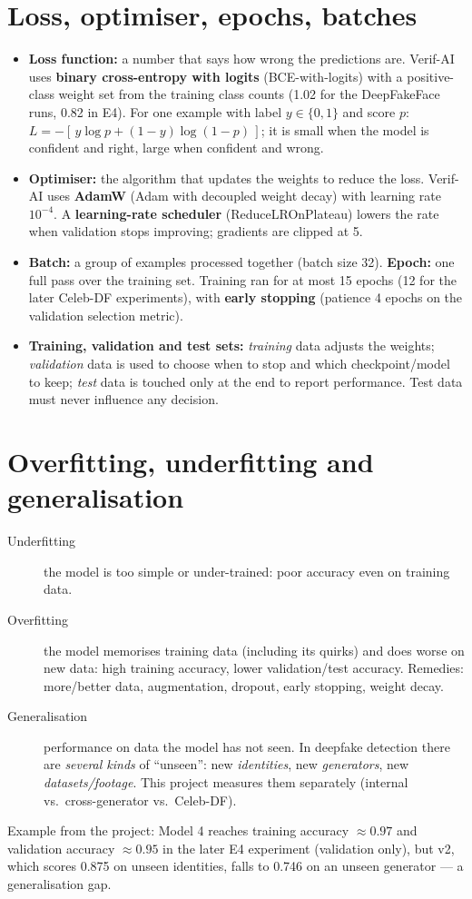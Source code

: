 \documentclass[11pt,a4paper]{report}
\begin{document}
\section{Loss, optimiser, epochs, batches}
\begin{itemize}
\item \textbf{Loss function:} a number that says how wrong the predictions are. Verif-AI uses \textbf{binary cross-entropy with logits} (BCE-with-logits) with a positive-class weight set from the training class counts (1.02 for the DeepFakeFace runs, 0.82 in E4).
For one example with label $y\in\{0,1\}$ and score $p$: $L=-[\,y\log p+(1-y)\log(1-p)\,]$; it is small when the model is confident and right, large when confident and wrong.
\item \textbf{Optimiser:} the algorithm that updates the weights to reduce the loss. Verif-AI uses \textbf{AdamW} (Adam with decoupled weight decay) with learning rate $10^{-4}$. A \textbf{learning-rate scheduler} (ReduceLROnPlateau) lowers the rate when validation stops improving; gradients are clipped at 5.
\item \textbf{Batch:} a group of examples processed together (batch size 32). \textbf{Epoch:} one full pass over the training set. Training ran for at most 15 epochs (12 for the later Celeb-DF experiments), with \textbf{early stopping} (patience 4 epochs on the validation selection metric).
\item \textbf{Training, validation and test sets:} \emph{training} data adjusts the weights; \emph{validation} data is used to choose when to stop and which checkpoint/model to keep; \emph{test} data is touched only at the end to report performance. Test data must never influence any decision.
\end{itemize}

\section{Overfitting, underfitting and generalisation}
\begin{description}
\item[Underfitting] the model is too simple or under-trained: poor accuracy even on training data.
\item[Overfitting] the model memorises training data (including its quirks) and does worse on new data: high training accuracy, lower validation/test accuracy. Remedies: more/better data, augmentation, dropout, early stopping, weight decay.
\item[Generalisation] performance on data the model has not seen. In deepfake detection there are \emph{several kinds} of ``unseen'': new \emph{identities}, new \emph{generators}, new \emph{datasets/footage}. This project measures them separately (internal vs.\ cross-generator vs.\ Celeb-DF).
\end{description}
Example from the project: Model 4 reaches training accuracy $\approx0.97$ and validation accuracy $\approx0.95$ in the later E4 experiment (validation only), but v2, which scores 0.875 on unseen identities, falls to 0.746 on an unseen generator --- a generalisation gap.
\end{document}
